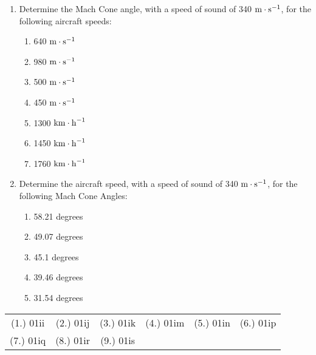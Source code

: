 \begin{eocexercises}{}
\begin{enumerate}
\item Determine the Mach Cone angle, with a speed of sound of 340 $\rm{m\cdot s}^{-1}$, for the following aircraft speeds:
\begin{enumerate}
\item 640 $\rm{m\cdot s}^{-1}$
\item 980 $\rm{m\cdot s}^{-1}$
\item 500 $\rm{m\cdot s}^{-1}$
\item 450 $\rm{m\cdot s}^{-1}$
\item 1300 $\rm{km\cdot h}^{-1}$
\item 1450 $\rm{km\cdot h}^{-1}$
\item 1760 $\rm{km\cdot h}^{-1}$
\end{enumerate}
\item Determine the aircraft speed, with a speed of sound of 340 $\rm{m\cdot s}^{-1}$, for the following Mach Cone Angles:
\begin{enumerate}
\item 58.21 degrees
\item 49.07 degrees
\item 45.1 degrees
\item 39.46 degrees
\item 31.54 degrees
\end{enumerate}
\end{enumerate}


\par \practiceinfo
\par \begin{tabular}[h]{cccccc}
(1.)	01ii	&
(2.)	01ij	&
(3.)	01ik	&
(4.)	01im	&
(5.)	01in	&
(6.)	01ip	\\ %
(7.)	01iq	&
(8.)	01ir	&
(9.)	01is	&
\end{tabular}
\end{eocexercises}





